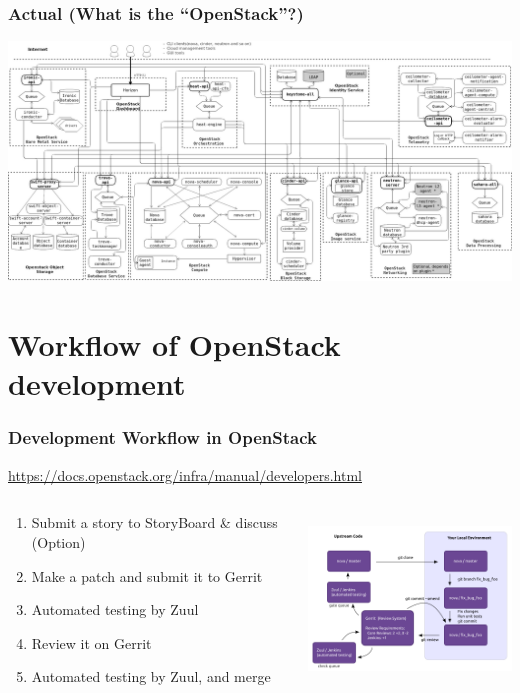 \documentclass[aspectratio=169,11pt,hyperref={colorlinks=true}]{beamer}
\begin{document}
\begin{frame}
  \frametitle{Actual (What is the ``OpenStack''?)}
  \begin{center}
    \includegraphics[width=1.0\textwidth]{images/openstack-arch-kilo-logical-v1.png}
  \end{center}
\end{frame}

\section{Workflow of OpenStack development}
\begin{frame}
  \frametitle{Development Workflow in OpenStack}
  \url{https://docs.openstack.org/infra/manual/developers.html}
  \begin{columns}[T]
    \begin{column}{0.5\textwidth}
      \begin{enumerate}
        \item Submit a story to StoryBoard \& discuss (Option)
        \item Make a patch and submit it to Gerrit
        \item Automated testing by Zuul
        \item Review it on Gerrit
        \item Automated testing by Zuul, and merge
      \end{enumerate}
    \end{column}
    \begin{column}{0.4\textwidth}
      \centering\includegraphics[height=45mm]{images/code_review.png}
    \end{column}
  \end{columns}
\end{frame}
\end{document}
